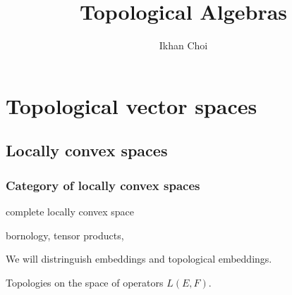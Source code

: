 \documentclass{../../large}
\begin{document}
\title{Topological Algebras}
\author{Ikhan Choi}
\maketitle
\tableofcontents



\part{Topological vector spaces}
\chapter{Locally convex spaces}

\section{Category of locally convex spaces}


complete locally convex space

bornology,
tensor products,

\begin{prb}
We will distringuish embeddings and topological embeddings.

Topologies on the space of operators $L(E,F)$.
\end{prb}
\end{document}
